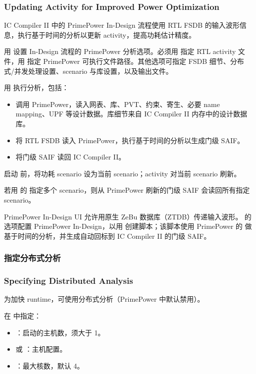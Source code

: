 \subsubsection*{Updating Activity for Improved Power Optimization}

IC Compiler II 中的 PrimePower In-Design 流程使用 RTL FSDB 的输入波形信息，执行基于时间的分析以更新 activity，提高功耗估计精度。

用  设置 In-Design 流程的 PrimePower 分析选项。必须用  指定 RTL activity 文件，用  指定 PrimePower 可执行文件路径。其他选项可指定 FSDB 细节、分布式/并发处理设置、scenario 与库设置，以及输出文件。

用  执行分析，包括：
\begin{itemize}
  \item 调用 PrimePower，读入网表、库、PVT、约束、寄生、必要 name mapping、UPF 等设计数据。库细节来自 IC Compiler II 内存中的设计数据库。
  \item 将 RTL FSDB 读入 PrimePower，执行基于时间的分析以生成门级 SAIF。
  \item 将门级 SAIF 读回 IC Compiler II。
\end{itemize}

启动  前，将功耗 scenario 设为当前 scenario；activity 对当前 scenario 刷新。

若用  的  指定多个 scenario，则从 PrimePower 刷新的门级 SAIF 会读回所有指定 scenario。

PrimePower In-Design UI 允许用原生 ZeBu 数据库（ZTDB）传递输入波形。 的  选项配置 PrimePower In-Design，以用  创建脚本；该脚本使用 PrimePower 的  做基于时间的分析，并生成自动回标到 IC Compiler II 的门级 SAIF。

\subsubsection{指定分布式分析}
\subsubsection*{Specifying Distributed Analysis}

为加快 runtime，可使用分布式分析（PrimePower 中默认禁用）。

在  中指定：
\begin{itemize}
  \item {}：启动的主机数，须大于 1。
  \item {} 或 ：主机配置。
  \item {}：最大核数，默认 4。
\end{itemize}

